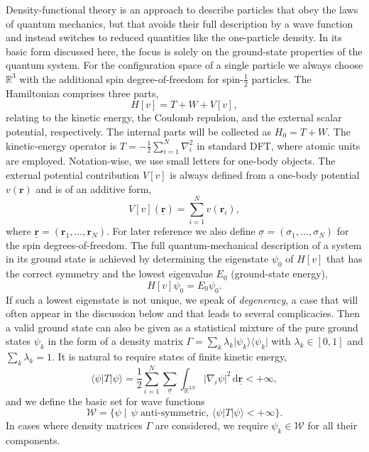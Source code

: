 \documentclass[journal=apcach,manuscript=article,layout=twocolumn]{achemso}
\newcommand{\R}{\mathbb{R}}
\renewcommand{\d}{\,\mathrm{d}} %
\newcommand{\psispace}{\mathcal{W}}
\newcommand{\rr}{\mathbf{r}}
\newcommand{\rrN}{\underline{\mathbf{r}}}
\newcommand{\sigmaN}{\underline{\sigma}}
\newcommand{\changed}[1] {{ {#1}}} %
\begin{document}
Density-functional theory is a\changed{n approach} to describe particles that obey the laws of quantum mechanics, but that avoids their full description by a wave function and instead switches to reduced quantities like the one-particle density. In its basic form discussed here, the focus is solely on the ground-state properties of the quantum system.
For the configuration space of a single particle we always choose $\R^3$ with the additional spin degree-of-freedom for spin-$\frac{1}{2}$ particles.
The Hamiltonian comprises three parts,
\begin{equation*}%
H[v] = T + W + V[v],
\end{equation*}
relating to the kinetic energy, the Coulomb repulsion, and the external scalar potential, respectively.
The internal parts will be collected as $H_0 = T + W$. The kinetic-energy operator is $T = -\frac{1}{2}\sum_{i=1}^N \nabla_i^2$ in standard DFT, where atomic units are employed.
%
Notation-wise, we use small letters for one-body objects. The external potential contribution $V[v]$ is always defined from a one-body potential $v(\rr)$ and is of an additive form,
\begin{equation*}%
V[v](\rrN) = \sum_{i=1}^N v(\rr_i),
\end{equation*}
where $\rrN=(\rr_1,\dots,\rr_N)$. For later reference we also define $\sigmaN = (\sigma_1,\dots,\sigma_N)$ for the spin degrees-of-freedom.
The full quantum-mechanical description of a system in its ground state is achieved by determining the eigenstate $\psi_0$ of $H[v]$ that has the correct symmetry and the lowest eigenvalue $E_0$ (ground-state energy),
\begin{equation}\label{eq:SE}
 H[v]\psi_0 = E_0 \psi_0.
\end{equation}
If such a lowest eigenstate is not unique, we speak of \emph{degeneracy}, a case that will often appear in the discussion below and that leads to several complicacies. Then a valid ground state can also be given as a statistical mixture of the pure ground states $\psi_k$ in the form of a density matrix $\Gamma = \sum_k \lambda_k \vert \psi_k\rangle \langle \psi_k \vert$ with $\lambda_k\in [0,1]$ and $\sum_k \lambda_k = 1$.
%
It is natural to require states of finite kinetic energy,
\begin{equation*}
   \langle \psi| T | \psi \rangle = \frac{1}{2}\sum_{i=1}^N \sum_{\sigmaN} \int_{\R^{3N}} |\nabla_i \psi|^2 \d\rrN < +\infty,
\end{equation*}
and we define the basic set for wave functions
\begin{equation*}
    \psispace = \{ \psi \mid \, \psi \; \text{anti-symmetric}, \,\langle \psi| T | \psi \rangle < +\infty  \}. %
\end{equation*}
%
In cases where density matrices $\Gamma$ are considered, we require $\psi_k\in\psispace$ for all their components.
\end{document}
